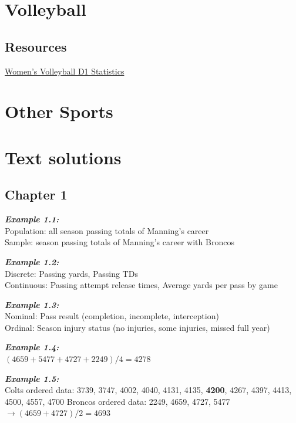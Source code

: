 \documentclass[
  11pt,
]{book}
\theoremstyle{definition}
\theoremstyle{definition}
\theoremstyle{definition}
\theoremstyle{definition}
\theoremstyle{remark}
\begin{document}
\hypertarget{volleyball-1}{%
\chapter{Volleyball}\label{volleyball-1}}

\hypertarget{resources}{%
\section{Resources}\label{resources}}

\href{https://www.ncaa.com/stats/volleyball-women/d1}{Women's Volleyball D1 Statistics}

\hypertarget{other-sports}{%
\chapter{Other Sports}\label{other-sports}}

\hypertarget{text-solutions}{%
\chapter{Text solutions}\label{text-solutions}}

\hypertarget{chapter-1}{%
\section{Chapter 1}\label{chapter-1}}

\textbf{\emph{Example 1.1:}}\\
Population: all season passing totals of Manning's career\\
Sample: season passing totals of Manning's career with Broncos

\textbf{\emph{Example 1.2:}}\\
Discrete: Passing yards, Passing TDs\\
Continuous: Passing attempt release times, Average yards per pass by game

\textbf{\emph{Example 1.3:}}\\
Nominal: Pass result (completion, incomplete, interception)\\
Ordinal: Season injury status (no injuries, some injuries, missed full year)

\textbf{\emph{Example 1.4:}}\\
\((4659 + 5477 + 4727 + 2249)/4 = 4278\)

\textbf{\emph{Example 1.5:}}\\
Colts ordered data: 3739, 3747, 4002, 4040, 4131, 4135, \textbf{4200}, 4267, 4397, 4413, 4500, 4557, 4700
Broncos ordered data: 2249, 4659, 4727, 5477 \(\to (4659+4727)/2 = 4693\)
\end{document}
